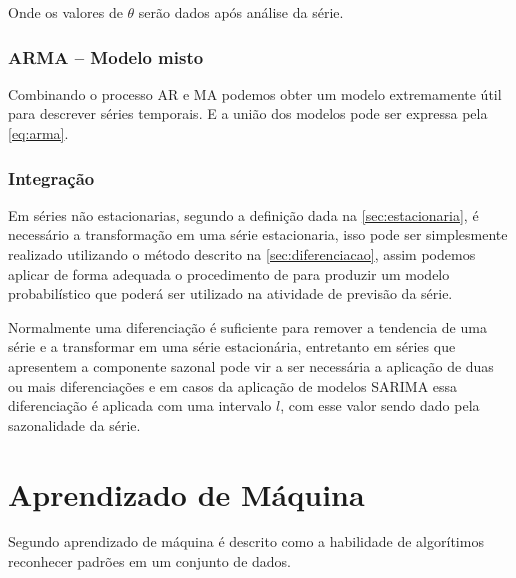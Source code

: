 \documentclass[
    12pt,
    oneside,
    a4paper,
    english,
    brazil
]{abntex2}
\begin{document}
Onde os valores de $\theta$ serão dados após análise da série.

\subsubsection{ARMA -- Modelo misto}

Combinando o processo AR e MA podemos obter um modelo extremamente útil para
descrever séries temporais. E a união dos modelos pode ser expressa pela
\autoref{eq:arma}.


\subsubsection{Integração}

Em séries não estacionarias, segundo a definição dada na
\autoref{sec:estacionaria}, é necessário a transformação em uma série
estacionaria, isso pode ser simplesmente realizado utilizando o método descrito
na \autoref{sec:diferenciacao}, assim podemos aplicar de forma adequada o
procedimento de  para produzir um modelo probabilístico que
poderá ser utilizado na atividade de previsão da série.

Normalmente uma diferenciação é suficiente para remover a tendencia de uma
série e a transformar em uma série estacionária, entretanto em séries que
apresentem a componente sazonal pode vir a ser necessária a aplicação de duas
ou mais diferenciações e em casos da aplicação de modelos SARIMA essa
diferenciação é aplicada com uma intervalo $l$, com esse valor sendo dado pela
sazonalidade da série.

\section{Aprendizado de Máquina}

Segundo  aprendizado de máquina é descrito como a
habilidade de algorítimos reconhecer padrões em um conjunto de dados.
\end{document}
